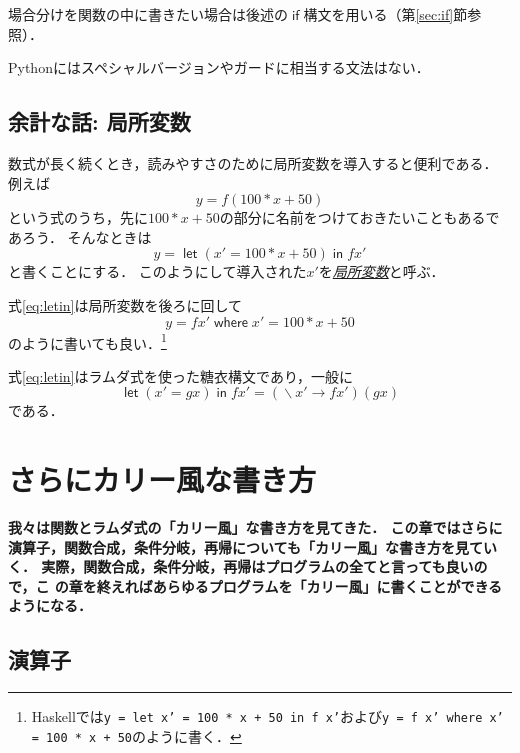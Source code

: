\documentclass[a5paper,draft]{jsbook}
\newcommand{\programminglanguage}[1]{\textsf{#1}}
\newcommand{\haskell}{\programminglanguage{Haskell}}
\newcommand{\python}{\programminglanguage{Python}}
\newenvironment{leader}{\begingroup\bf}{\endgroup}
\newcommand{\keyword}[1]{{\underline{\emph{#1}}}}
\newcommand{\code}[1]{\texttt{#1}}
\newcommand{\mathUnaryOperator}[1]{\operatorname{#1}}
\newcommand{\mathLambda}{\mathUnaryOperator{\backslash}}
\newcommand{\mathLambdaArrow}{\rightarrow}
\newcommand{\mathKeyword}[1]{\operatorname{\textsf{#1}}}
\newcommand{\mathIf}{\mathKeyword{if}}
\newcommand{\mathLetLet}{\mathKeyword{let}}
\newcommand{\mathLetIn}{\mathKeyword{in}}
\newcommand{\mathWhere}{\mathKeyword{where}}
\newcommand{\mathLambdaExpression}[2]{\mathLambda#1\mathLambdaArrow#2}
\newcommand{\mathLet}[2]{\mathLetLet#1\mathLetIn#2}
\begin{document}
場合分けを関数の中に書きたい場合は後述の$\mathIf$構文を用いる（第\ref{sec:if}節参照）．

\python にはスペシャルバージョンやガードに相当する文法はない．

\section{余計な話: 局所変数}

数式が長く続くとき，読みやすさのために局所変数を導入すると便利である．
例えば
\begin{equation}
y=f\left(100*x+50\right)
\end{equation}
という式のうち，先に$100*x+50$の部分に名前をつけておきたいこともあるであろう．
そんなときは
\begin{equation}
\label{eq:letin}
y=\mathLet{\left(x'=100*x+50\right)}{fx'}
\end{equation}
と書くことにする．
このようにして導入された$x'$を\keyword{局所変数}と呼ぶ．

式\eqref{eq:letin}は局所変数を後ろに回して
\begin{equation}
y=fx'\mathWhere x'=100*x+50
\end{equation}
のように書いても良い．\footnote{\haskell では\code{y = let x' = 100 * x + 50 in f x'}および\code{y = f x' where x' = 100 * x + 50}のように書く．}

式\eqref{eq:letin}はラムダ式を使った糖衣構文であり，一般に
\begin{equation}
\mathLet{\left(x'=gx\right)}{fx'}=(\mathLambdaExpression{x'}{fx'})(gx)
\end{equation}
である．

\chapter{さらにカリー風な書き方}

\begin{leader}
我々は関数とラムダ式の「カリー風」な書き方を見てきた．
この章ではさらに演算子，関数合成，条件分岐，再帰についても「カリー風」な書き方を見ていく．
実際，関数合成，条件分岐，再帰はプログラムの全てと言っても良いので，こ
の章を終えればあらゆるプログラムを「カリー風」に書くことができるようになる．
\end{leader}

\section{演算子}
\end{document}
